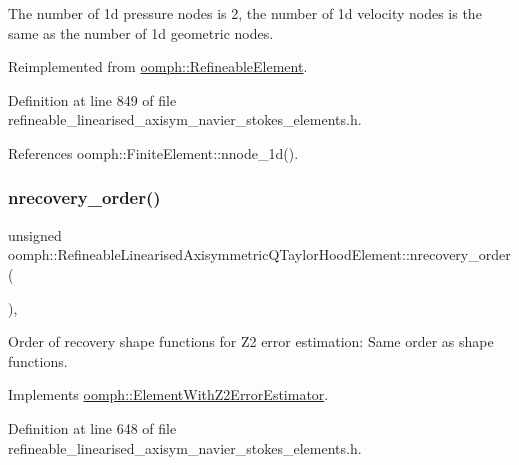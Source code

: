 The number of 1d pressure nodes is 2, the number of 1d velocity nodes is the same as the number of 1d geometric nodes. 



Reimplemented from \hyperlink{classoomph_1_1RefineableElement_a850180084aaf164550b4f4978b42cda7}{oomph\+::\+Refineable\+Element}.



Definition at line 849 of file refineable\+\_\+linearised\+\_\+axisym\+\_\+navier\+\_\+stokes\+\_\+elements.\+h.



References oomph\+::\+Finite\+Element\+::nnode\+\_\+1d().

\mbox{\label{classoomph_1_1RefineableLinearisedAxisymmetricQTaylorHoodElement_a404f83f61a4acf243319b2c618024f27}} 
\subsubsection{\texorpdfstring{nrecovery\+\_\+order()}{nrecovery\_order()}}
{\footnotesize\ttfamily unsigned oomph\+::\+Refineable\+Linearised\+Axisymmetric\+Q\+Taylor\+Hood\+Element\+::nrecovery\+\_\+order (\begin{DoxyParamCaption}{ }\end{DoxyParamCaption})\hspace{0.3cm}{\ttfamily [inline]}, {\ttfamily [virtual]}}



Order of recovery shape functions for Z2 error estimation\+: Same order as shape functions. 



Implements \hyperlink{classoomph_1_1ElementWithZ2ErrorEstimator_af39480835bd3e0f6b2f4f7a9a4044798}{oomph\+::\+Element\+With\+Z2\+Error\+Estimator}.



Definition at line 648 of file refineable\+\_\+linearised\+\_\+axisym\+\_\+navier\+\_\+stokes\+\_\+elements.\+h.

\mbox{\label{classoomph_1_1RefineableLinearisedAxisymmetricQTaylorHoodElement_add76773c8f20bd70e3b3d3aa23dcca6d}} 
